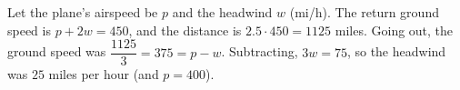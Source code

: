 Let the plane's airspeed be $p$ and the headwind $w$ (mi/h). The return ground speed is $p+2w=450$, and the distance is $2.5\cdot450=1125$ miles. Going out, the ground speed was $\dfrac{1125}{3}=375=p-w$. Subtracting, $3w=75$, so the headwind was $\boxed{25}$ miles per hour (and $p=400$).
